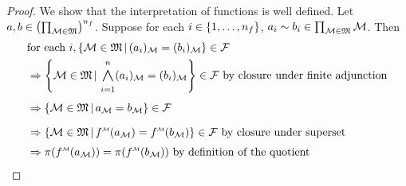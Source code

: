 \begin{proof}
    We show that the interpretation of functions is well defined.
    Let $a, b \in \left(\prod_{\mathcal{M} \in \mathfrak{M}}\right)^{n_f}$.
    Suppose for each $i \in \left\{1,\dots,n_f\right\}$, 
    $a_i \sim b_i \in \prod_{\mathcal{M} \in \mathfrak{M}} \mathcal{M}$.
    Then 
    \begin{align*}
        &\text{for each } i, 
        \set{\MM \in \f{M} \st (a_i)_\MM = (b_i)_\MM} \in \FF \\
        &\implies
        \set{\MM \in \f{M} \st \bigand{i = 1}{n} (a_i)_\MM = (b_i)_\MM} \in \FF
        \text{ by closure under finite adjunction}\\
        &\implies
        \set{\MM \in \f{M} \st a_\MM = b_\MM} \in \FF\\
        &\implies
        \set{\MM \in \f{M} \st 
            \modintp{\MM}{f}(a_\MM) = \modintp{\MM}{f}(b_\MM)} \in \FF
        \text{ by closure under superset}\\
        &\implies \pi(\mmintp{f}(a_\MM)) = \pi(\mmintp{f}(b_\MM))
        \text{ by definition of the quotient}
    \end{align*}


\end{proof}
